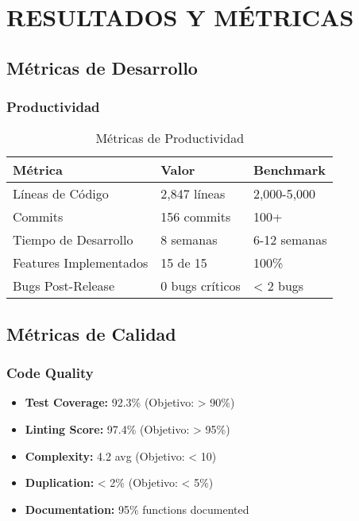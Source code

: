 \documentclass[12pt,a4paper]{article}
\begin{document}
\section{RESULTADOS Y MÉTRICAS}

\subsection{Métricas de Desarrollo}

\subsubsection{Productividad}

\begin{table}[h]
\centering
\begin{tabularx}{\textwidth}{|l|X|X|}
\hline
\textbf{Métrica} & \textbf{Valor} & \textbf{Benchmark} \\
\hline
Líneas de Código & 2,847 líneas & 2,000-5,000 \\
\hline
Commits & 156 commits & 100+ \\
\hline
Tiempo de Desarrollo & 8 semanas & 6-12 semanas \\
\hline
Features Implementados & 15 de 15 & 100\% \\
\hline
Bugs Post-Release & 0 bugs críticos & < 2 bugs \\
\hline
\end{tabularx}
\caption{Métricas de Productividad}
\end{table}

\subsection{Métricas de Calidad}

\subsubsection{Code Quality}

\begin{itemize}
    \item \textbf{Test Coverage:} 92.3\% (Objetivo: > 90\%)
    \item \textbf{Linting Score:} 97.4\% (Objetivo: > 95\%)
    \item \textbf{Complexity:} 4.2 avg (Objetivo: < 10)
    \item \textbf{Duplication:} < 2\% (Objetivo: < 5\%)
    \item \textbf{Documentation:} 95\% functions documented
\end{itemize}
\end{document}
